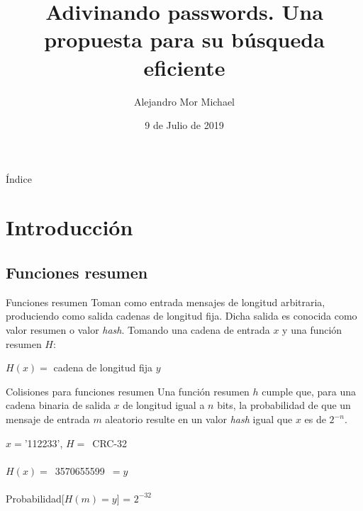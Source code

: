 \documentclass{beamer}
\title[Buscando colisiones de forma eficiente]{Adivinando passwords. Una propuesta para su búsqueda eficiente}
\author{Alejandro Mor Michael}
\date{9 de Julio de 2019}
\begin{document}
\maketitle

\begin{frame}{Índice}
	\tableofcontents
\end{frame}

\section{Introducción}

\subsection{Funciones resumen}

\begin{frame}{Funciones resumen}
	Toman como entrada mensajes de longitud arbitraria, produciendo como salida cadenas de longitud fija. Dicha salida es conocida como valor resumen o valor \textit{hash}. Tomando una cadena de entrada $x$ y una función resumen $H$:\\
	\begin{center}
		$H(x) = $ cadena de longitud fija $y$
	\end{center}
\end{frame}

\begin{frame}{Colisiones para funciones resumen}
	Una función resumen $h$ cumple que, para una cadena binaria de salida $x$ de longitud igual a $n$ bits, la probabilidad de que un mensaje de entrada $m$ aleatorio resulte en un valor \textit{hash} igual que $x$ es de $2^{-n}$.
	\begin{center}
		$x = $'112233', $H = $~CRC-32\\
		~\\
		$H(x) = $~3570655599~$ = y$\\
		~\\
		Probabilidad[$H(m) = y$] = $2^{-32}$
	\end{center}
\end{frame}
\end{document}
